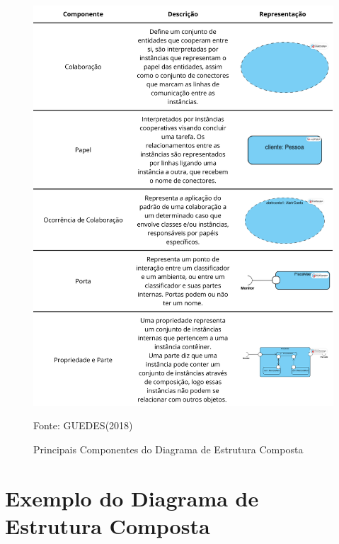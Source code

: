 \documentclass[12pt,openright,oneside,a4paper,
	chapter=TITLE,
	section=TITLE,
	english,brazil]{abntex2}
\begin{document}
\begin{figure}[!htp]
	\caption{Principais Componentes do Diagrama de Estrutura Composta}
	\centering
	\includegraphics[scale=0.15]{img/Componentes Principais do Diagrama de Estrutura Composta.png}
	\\

	\footnotesize\raggedright Fonte: GUEDES(2018)
\end{figure}

\pagebreak
\section{Exemplo do Diagrama de Estrutura Composta}
\end{document}
